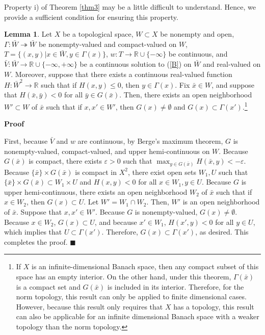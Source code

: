 \documentclass[a4paper,12pt]{article}
\makeatletter
\renewenvironment{proof}[1][\proofname]{\par
  \pushQED{\qed}%
  \normalfont \topsep6\p@\@plus6\p@\relax
  \trivlist
  \item\relax
  {\bfseries
  #1\@addpunct{.}}\hspace\labelsep\ignorespaces
}{%
  \popQED\endtrivlist\@endpefalse
}
\theoremstyle{definition}
\newtheorem{lem}{Lemma}
\renewcommand{\proofname}{Proof}
\makeatother
\begin{document}
Property i) of Theorem \ref{thm3} may be a little difficult to understand. Hence, we provide a sufficient condition for ensuring this property.

\begin{lem}\label{lem1}
Let $X$ be a topological space, $W\subset X$ be nonempty and open, $\Gamma:\bar{W}\twoheadrightarrow \bar{W}$ be nonempty-valued and compact-valued on $W$, $T=\{(x,y)|x\in \bar{W},y\in \Gamma(x)\}$, $w:T\to \mathbb{R}\cup\{-\infty\}$ be continuous, and $\bar{V}:\bar{W}\to \mathbb{R}\cup\{-\infty,+\infty\}$ be a continuous solution to (\ref{B}) on $\bar{W}$ and real-valued on $W$. Moreover, suppose that there exists a continuous real-valued function $H:\bar{W}^2\to \mathbb{R}$ such that if $H(x,y)\le 0$, then $y\in \Gamma(x)$. Fix $\bar{x}\in W$, and suppose that $H(\bar{x},\bar{y})<0$ for all $\bar{y}\in G(\bar{x})$. Then, there exists an open neighborhood $W'\subset W$ of $\bar{x}$ such that if $x,x'\in W'$, then $G(x)\neq \emptyset$ and $G(x)\subset \Gamma(x')$.\footnote{If $X$ is an infinite-dimensional Banach space, then any compact subset of this space has an empty interior. On the other hand, under this theorem, $\Gamma(\bar{x})$ is a compact set and $G(\bar{x})$ is included in its interior. Therefore, for the norm topology, this result can only be applied to finite dimensional cases. However, because this result only requires that $X$ has a topology, this result can also be applicable for an infinite dimensional Banach space with a weaker topology than the norm topology.}
\end{lem}

\begin{proof}
First, because $\bar{V}$ and $w$ are continuous, by Berge's maximum theorem, $G$ is nonempty-valued, compact-valued, and upper hemi-continuous on $W$. Because $G(\bar{x})$ is compact, there exists $\varepsilon>0$ such that $\max_{y\in G(\bar{x})}H(\bar{x},y)<-\varepsilon$. Because $\{\bar{x}\}\times G(\bar{x})$ is compact in $X^2$, there exist open sets $W_1,U$ such that $\{\bar{x}\}\times G(\bar{x})\subset W_1\times U$ and $H(x,y)<0$ for all $x\in W_1, y\in U$. Because $G$ is upper hemi-continuous, there exists an open neighborhood $W_2$ of $\bar{x}$ such that if $x\in W_2$, then $G(x)\subset U$. Let $W'=W_1\cap W_2$. Then, $W'$ is an open neighborhood of $\bar{x}$. Suppose that $x,x'\in W'$. Because $G$ is nonempty-valued, $G(x)\neq \emptyset$. Because $x\in W_2$, $G(x)\subset U$, and because $x'\in W_1$, $H(x',y)<0$ for all $y\in U$, which implies that $U\subset \Gamma(x')$. Therefore, $G(x)\subset \Gamma(x')$, as desired. This completes the proof. $\blacksquare$
\end{proof}
\end{document}
